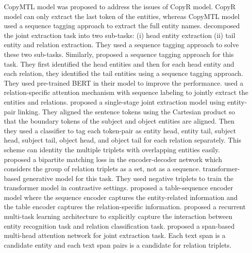 CopyMTL model  was proposed to address the issues of CopyR  model. CopyR model can only extract the last token of the entities, whereas CopyMTL model used a sequence tagging approach to extract the full entity names.  decomposed the joint extraction task into two sub-tasks: (i) head entity extraction (ii) tail entity and relation extraction. They used a sequence tagging approach to solve these two sub-tasks. Similarly,  proposed a sequence tagging approach for this task. They first identified the head entities and then for each head entity and each relation, they identified the tail entities using a sequence tagging approach. They used pre-trained BERT  in their model to improve the performance.  used a relation-specific attention mechanism with sequence labeling to jointly extract the entities and relations.  proposed a single-stage joint extraction model using entity-pair linking. They aligned the sentence tokens using the Cartesian product so that the boundary tokens of the subject and object entities are aligned. Then they used a classifier to tag each token-pair as entity head, entity tail, subject head, subject tail, object head, and object tail for each relation separately. This scheme can identity the multiple triplets with overlapping entities easily.  proposed a bipartite matching loss in the encoder-decoder network which considers the group of relation triplets as a set, not as a sequence.  transformer-based generative model for this task. They used negative triplets to train the transformer model in contrastive settings.  proposed a table-sequence encoder model where the sequence encoder captures the entity-related information and the table encoder captures the relation-specific information.  proposed a recurrent multi-task learning architecture to explicitly capture the interaction between entity recognition task and relation classification task.  proposed a span-based multi-head attention network for joint extraction task. Each text span is a candidate entity and each text span pairs is a candidate for relation triplets.


